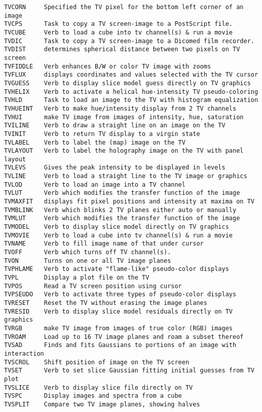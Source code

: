\begin{verbatim}
TVCORN     Specified the TV pixel for the bottom left corner of an image
TVCPS      Task to copy a TV screen-image to a PostScript file.
TVCUBE     Verb to load a cube into tv channel(s) & run a movie
TVDIC      Task to copy a TV screen-image to a Dicomed film recorder.
TVDIST     determines spherical distance between two pixels on TV screen
TVFIDDLE   Verb enhances B/W or color TV image with zooms
TVFLUX     displays coordinates and values selected with the TV cursor
TVGUESS    Verb to display slice model guess directly on TV graphics
TVHELIX    Verb to activate a helical hue-intensity TV pseudo-coloring
TVHLD      Task to load an image to the TV with histogram equalization
TVHUEINT   Verb to make hue/intensity display from 2 TV channels
TVHUI      make TV image from images of intensity, hue, saturation
TVILINE    Verb to draw a straight line on an image on the TV
TVINIT     Verb to return TV display to a virgin state
TVLABEL    Verb to label the (map) image on the TV
TVLAYOUT   Verb to label the holography image on the TV with panel layout
TVLEVS     Gives the peak intensity to be displayed in levels
TVLINE     Verb to load a straight line to the TV image or graphics
TVLOD      Verb to load an image into a TV channel
TVLUT      Verb which modifies the transfer function of the image
TVMAXFIT   displays fit pixel positions and intensity at maxima on TV
TVMBLINK   Verb which blinks 2 TV planes either auto or manually
TVMLUT     Verb which modifies the transfer function of the image
TVMODEL    Verb to display slice model directly on TV graphics
TVMOVIE    Verb to load a cube into tv channel(s) & run a movie
TVNAME     Verb to fill image name of that under cursor
TVOFF      Verb which turns off TV channel(s).
TVON       Turns on one or all TV image planes
TVPHLAME   Verb to activate "flame-like" pseudo-color displays
TVPL       Display a plot file on the TV
TVPOS      Read a TV screen position using cursor
TVPSEUDO   Verb to activate three types of pseudo-color displays
TVRESET    Reset the TV without erasing the image planes
TVRESID    Verb to display slice model residuals directly on TV graphics
TVRGB      make TV image from images of true color (RGB) images
TVROAM     Load up to 16 TV image planes and roam a subset thereof
TVSAD      Finds and fits Gaussians to portions of an image with interaction
TVSCROL    Shift position of image on the TV screen
TVSET      Verb to set slice Gaussian fitting initial guesses from TV plot
TVSLICE    Verb to display slice file directly on TV
TVSPC      Display images and spectra from a cube
TVSPLIT    Compare two TV image planes, showing halves

\end{verbatim}
